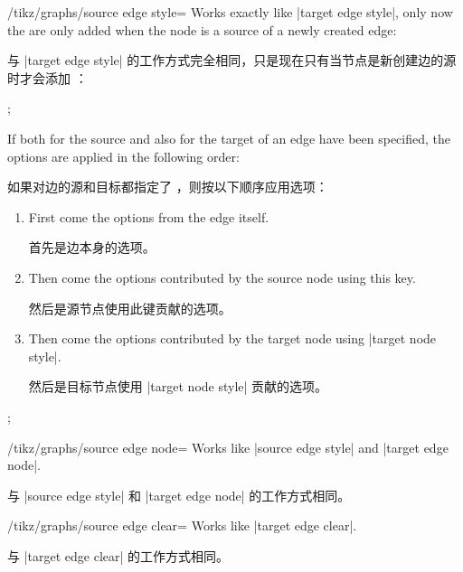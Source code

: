\begin{key}{/tikz/graphs/source edge style=}
    Works exactly like |target edge style|, only now the  are
    only added when the node is a source of a newly created edge:
    
    与 |target edge style| 的工作方式完全相同，只是现在只有当节点是新创建边的源时才会添加 ：
\begin{codeexample}[preamble={\usetikzlibrary{graphs}}]
\tikz {};
\end{codeexample}
    If both for the source and also for the target of an edge 
    have been specified, the options are applied in the following order:
    
    如果对边的源和目标都指定了 ，则按以下顺序应用选项：
    \begin{enumerate}
        \item First come the options from the edge itself.

        首先是边本身的选项。

        \item Then come the options contributed by the source node using this
            key.

            然后是源节点使用此键贡献的选项。
        \item Then come the options contributed by the target node using
            |target node style|.

            然后是目标节点使用 |target node style| 贡献的选项。
    \end{enumerate}
\begin{codeexample}[preamble={\usetikzlibrary{graphs}}]
\tikz {};
\end{codeexample}
\end{key}

\begin{key}{/tikz/graphs/source edge node=}
    Works like |source edge style| and |target edge node|.

    与 |source edge style| 和 |target edge node| 的工作方式相同。
\end{key}

\begin{key}{/tikz/graphs/source edge clear=}
    Works like |target edge clear|.

    与 |target edge clear| 的工作方式相同。
  \end{key}


